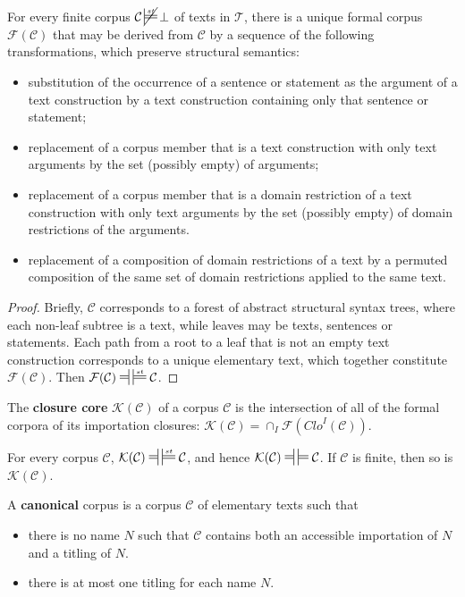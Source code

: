 \documentclass{IOS-Book-Article}
\newcommand{\corp}{ \mathcal{C} }
\newcommand{\texts}{ \mathcal{T} }
\newcommand{\Formal}{\mathcal{F}}
\newcommand{\Core}{\mathcal{K}}
\newcommand{\Clo}{\mathit{Clo}}
\newcommand{\mdpfEquiv}{\ensuremath{\ndststile[ss]{\hspace*{3 pt }}{}\hspace*{3 pt}\sdtstile[ss]{}{}}}
\newcommand{\mdpfstruct}{\ensuremath{\sdtstile[ss]{}{st}}}
\newcommand{\mdpfstructEquiv}{\ensuremath{\ndststile[ss]{\hspace*{3 pt }}{}\hspace*{3 pt}\sdtstile[ss]{}{st}}}
\DeclareMathOperator*{\nmdpfstruct}{\cancel{\mdpfstruct}}
\begin{document}
\begin{theo}
\label{formal}
For every finite corpus $\corp\nmdpfstruct\bot$ of texts in $\texts$, there is a unique formal corpus $\Formal(\corp)$ that may be derived from $\corp$ by a sequence of the following transformations, which preserve structural semantics:
\begin{itemize}
\item substitution of the occurrence of a sentence or statement as the argument of a text construction by a text construction containing only that sentence or statement;
\item replacement of a corpus member that is a text construction with only text arguments by the set (possibly empty) of arguments;
\item replacement of a corpus member that is a domain restriction of a text construction with only text arguments by the set (possibly empty) of domain restrictions of the arguments.
\item replacement of a composition of domain restrictions of a text by a permuted composition of the same set of domain restrictions applied to the same text.
\end{itemize}
\begin{proof} Briefly, $\corp$ corresponds to a forest of abstract structural syntax trees, where each non-leaf subtree is a text, while leaves may be texts, sentences or statements. Each path from a root to a leaf that is not an empty text construction corresponds to a unique elementary text, which together constitute $\Formal(\corp)$. Then $\Formal(\corp)\mdpfstructEquiv\corp$.
\end{proof}
\end{theo}

\noindent The \textbf{closure core} $\Core(\corp)$ of a corpus $\corp$ is the intersection of all of the formal corpora of its importation closures: $\Core(\corp)= \cap_I \Formal(\Clo^I(\corp))$.

\begin{theo}
\label{core}
For every corpus $\corp$, $\Core(\corp)\mdpfstructEquiv\corp$, and hence $\Core(\corp)\mdpfEquiv\corp$.
If $\corp$ is finite, then so is $\Core(\corp)$.
\end{theo}

\noindent A \textbf{canonical} corpus is a corpus $\corp$ of elementary texts such that 
\begin{itemize}
\item there is no name $N$ such that $\corp$ contains both an accessible importation of $N$ and a titling of $N$.
\item there is at most one titling for each name $N$.
\end{itemize}
\end{document}
